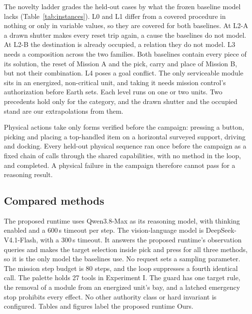 The novelty ladder grades the held-out cases by what the frozen baseline model lacks (Table~\ref{tab:instances}). L0
and L1 differ from a covered procedure in nothing or only in variable values, so they are covered for both baselines.
At L2-A a drawn shutter makes every reset trip again, a cause the baselines do not model. At L2-B the destination is
already occupied, a relation they do not model. L3 needs a composition across the two families. Both baselines contain
every piece of its solution, the reset of Mission A and the pick, carry and place of Mission B, but not their
combination. L4 poses a goal conflict. The only serviceable module sits in an energized, non-critical unit, and taking it
needs mission control's authorization before Earth sets. Each level runs on one or two units. Two precedents hold only
for the category, and the drawn shutter and the occupied stand are our extrapolations from them.

Physical actions take only forms verified before the campaign: pressing a button, picking and placing a top-handled item
on a horizontal surveyed support, driving and docking. Every held-out physical sequence ran once before the campaign as a
fixed chain of calls through the shared capabilities, with no method in the loop, and completed. A physical failure in
the campaign therefore cannot pass for a reasoning result.

\subsection{Compared methods}
\label{sec:setup-baselines}

The proposed runtime uses Qwen3.8-Max as its reasoning model, with thinking enabled and a 600\,s timeout per step. The
vision-language model is DeepSeek-V4.1-Flash, with a 300\,s timeout. It answers the proposed runtime's observation
queries and makes the target selection inside pick and press for all three methods, so it is the only model the
baselines use. No request sets a sampling parameter. The mission step budget is 80 steps, and the loop suppresses a
fourth identical call. The palette holds 27 tools in Experiment I. The guard has one target rule, the removal of a module
from an energized unit's bay, and a latched emergency stop prohibits every effect. No other authority class or hard
invariant is configured. Tables and figures label the proposed runtime Ours.

